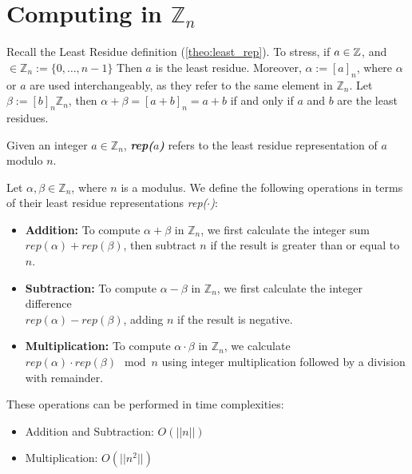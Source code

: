 \newpage 
\section{Computing in \(\mathbb{Z}_n\)}
Recall the Least Residue definition (\ref{theo:least_rep}). 
To stress, if $a\in\mathbb{Z}$, and $\in\mathbb{Z}_n:=\{0,\dots,n-1\}$ Then $a$ is the least residue.
Moreover, $\alpha:=[a]_n$, where $\alpha$ or $a$ are used interchangeably, as they refer to the same element in $\mathbb{Z}_n$.
Let $\beta:=[b]_n\mathbb{Z}_n$, then $\alpha+\beta=[a+b]_n=a+b$ if and only if $a$ and $b$ are the least residues. 

\begin{Func}

    Given an integer $a \in \mathbb{Z}_n$, \textbf{\textit{rep($a$)}} refers to the least residue representation of $a$ modulo $n$.
\end{Func}

\begin{theo}

    \label{theo:zn_operations}
    Let $\alpha, \beta \in \mathbb{Z}_n$, where $n$ is a modulus. We define the following operations in terms of their least residue representations \textit{rep($\cdot$)}:
    \begin{itemize}
        \item \textbf{Addition:} To compute \(\alpha + \beta\) in \(\mathbb{Z}_n\), we first calculate the integer sum \(\textit{rep}(\alpha) + \textit{rep}(\beta)\), then subtract $n$ if the result is greater than or equal to $n$.
        \item \textbf{Subtraction:} To compute \(\alpha - \beta\) in \(\mathbb{Z}_n\), we first calculate the integer difference\\
         \(\textit{rep}(\alpha) - \textit{rep}(\beta)\), adding $n$ if the result is negative.
        \item \textbf{Multiplication:} To compute \(\alpha \cdot \beta\) in \(\mathbb{Z}_n\), we calculate \(\textit{rep}(\alpha) \cdot \textit{rep}(\beta) \mod n\) using integer multiplication followed by a division with remainder.
    \end{itemize}
    These operations can be performed in time complexities:
    \begin{itemize}
        \item Addition and Subtraction: \(O(||n||)\)
        \item Multiplication: \(O(||n^2||)\)
    \end{itemize}
\end{theo}